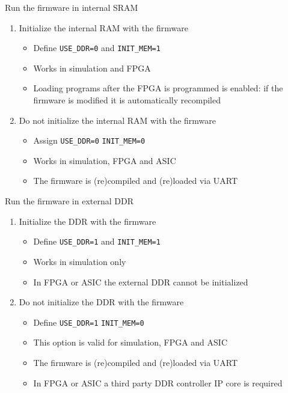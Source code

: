 \documentclass [xcolor=svgnames, t] {beamer}
\begin{document}
\begin{frame}{Run the firmware in internal SRAM}
\begin{enumerate}
\item Initialize the internal RAM with the firmware
  \begin{itemize}
  \item Define {\tt USE\_DDR=0} and {\tt INIT\_MEM=1}
  \item Works in simulation and FPGA
  \item Loading programs after the FPGA is programmed is enabled: if the firmware is modified it is automatically recompiled
  \end{itemize}
\item Do not initialize the internal RAM with the firmware
  \begin{itemize}
  \item Assign {\tt USE\_DDR=0} {\tt INIT\_MEM=0}
  \item Works in simulation, FPGA and ASIC
  \item The firmware is (re)compiled and (re)loaded via UART
  \end{itemize}
\end{enumerate}
\end{frame}

\begin{frame}{Run the firmware in external DDR}
\begin{enumerate}
\item Initialize the DDR with the firmware
  \begin{itemize}
  \item Define {\tt USE\_DDR=1} and {\tt INIT\_MEM=1}
  \item Works in simulation only
  \item In FPGA or ASIC the external DDR cannot be initialized
  \end{itemize}
\item Do not initialize the DDR with the firmware
  \begin{itemize}
  \item Define {\tt USE\_DDR=1} {\tt INIT\_MEM=0}
  \item This option is valid for simulation, FPGA and ASIC
  \item The firmware is (re)compiled and (re)loaded via UART
  \item In FPGA or ASIC a third party DDR controller IP core is required
  \end{itemize}
\end{enumerate}
\end{frame}
\end{document}
